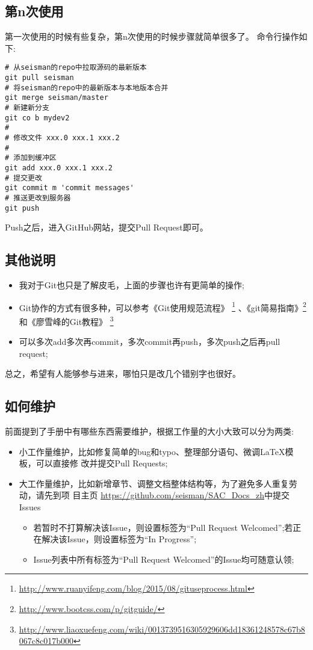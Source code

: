 \subsection{第n次使用}
第一次使用的时候有些复杂，第n次使用的时候步骤就简单很多了。
命令行操作如下:
\begin{verbatim}
# 从seisman的repo中拉取源码的最新版本
git pull seisman
# 将seisman的repo中的最新版本与本地版本合并
git merge seisman/master
# 新建新分支
git co ­b mydev2
#
# 修改文件 xxx.0 xxx.1 xxx.2
#
# 添加到缓冲区
git add xxx.0 xxx.1 xxx.2
# 提交更改
git commit ­m 'commit messages'
# 推送更改到服务器
git push
\end{verbatim}
Push之后，进入GitHub网站，提交Pull Request即可。
\subsection{其他说明}
\begin{itemize}
\item 我对于Git也只是了解皮毛，上面的步骤也许有更简单的操作;
\item Git协作的方式有很多种，可以参考《Git使用规范流程》
\footnote{\url{http://www.ruanyifeng.com/blog/2015/08/git­use­process.html}}
、《git简易指南》\footnote{\url{http://www.bootcss.com/p/git­guide/}}
和《廖雪峰的Git教程》
\footnote{\url{http://www.liaoxuefeng.com/wiki/0013739516305929606dd18361248578c67b8067c8c017b000}}
\item 可以多次add多次再commit，多次commit再push，多次push之后再pull request;
\end{itemize}
总之，希望有人能够参与进来，哪怕只是改几个错别字也很好。
\subsection{如何维护}
前面提到了手册中有哪些东西需要维护，根据工作量的大小大致可以分为两类:
\begin{itemize}
\item 小工作量维护，比如修复简单的bug和typo、整理部分语句、微调LaTeX模板，可以直接修
改并提交Pull Requests;
\item 大工作量维护，比如新增章节、调整文档整体结构等，为了避免多人重复劳动，请先到项
目主页 \url{https://github.com/seisman/SAC_Docs_zh}中提交Issues
\begin{itemize}
\item 若暂时不打算解决该Issue，则设置标签为“Pull Request Welcomed”;若正在解决该Issue，则设置标签为“In Progress”;
\item Issue列表中所有标签为“Pull Request Welcomed”的Issue均可随意认领;
\end{itemize}
\end{itemize}
